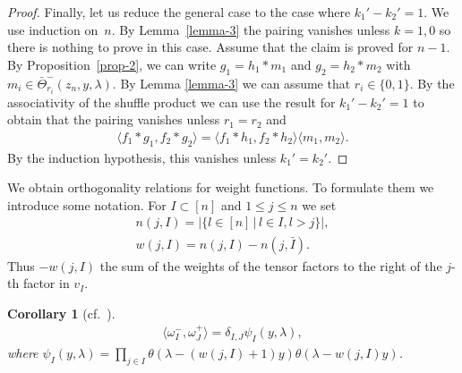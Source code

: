 \documentclass[10pt,a4paper]{amsart}
\numberwithin{equation}{section}
\newtheorem{Corollary}[Theorem]{Corollary}
\begin{document}
\begin{proof}
Finally, let us reduce the general case to the case where $k_1'-k_2'=1$. We use induction on~$n$. By Lemma~\ref{lemma-3} the pairing vanishes unless $k=1,0$ so there is nothing to prove in this case. Assume that the claim is proved for $n-1$. By Proposition~\ref{prop-2}, we can write $g_1=h_1*m_1$ and $g_2=h_2*m_2$ with $m_i\in\bar\Theta^-_{r_i}(z_{n},y,\lambda)$. By Lemma \ref{lemma-3} we can assume that $r_i\in\{0,1\}$. By the associativity of the shuffle product we can use the result for $k_1'-k_2'=1$ to obtain that the pairing vanishes unless $r_1=r_2$ and
\begin{gather*}
 \langle f_1*g_1,f_2*g_2\rangle=\langle f_1*h_1,f_2*h_2\rangle\langle m_1,m_2\rangle.
 \end{gather*}
By the induction hypothesis, this vanishes unless $k_1'=k_2'$.
\end{proof}

We obtain orthogonality relations for weight functions. To formulate them we introduce some notation. For $I\subset [n]$ and $1\leq j\leq n$ we set
\begin{gather}
 n(j,I)=|\{l\in[n]\,|\,l\in I, l>j\}|,\nonumber\\
 w(j,I)=n(j,I)-n(j,\bar I).\label{eq-w}
\end{gather}
Thus $-w(j,I)$ the sum of the weights of the tensor factors to the right of the $j$-th factor in $v_I$.
 \begin{Corollary}[{cf.~\cite[Theorem~C.4]{TV2}}]\label{cor-2}
 \begin{gather*}
 \langle\omega^-_I,\omega^+_J\rangle = \delta_{I,J}\psi_I(y,\lambda),
 \end{gather*}
 where $\psi_I(y,\lambda)= \prod\limits_{j\in I}\theta(\lambda-(w(j,I)+1)y)\theta(\lambda-w(j,I)y)$.
 \end{Corollary}
\end{document}
